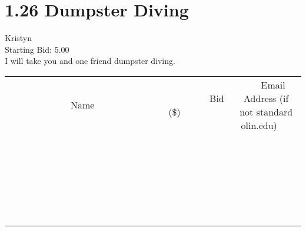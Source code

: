 \documentclass[11pt]{article}
\begin{document}
					\section*{1.26 Dumpster Diving}
					Kristyn \\
					Starting Bid: 5.00 \\
					I will take you and one friend dumpster diving. \\
					[6ex]
					\begin{tabular}{c c c}
						~~~~~~~~~~~~~Name~~~~~~~~~~~~~ & ~~~~~~~~~Bid (\$)~~~~~~~~~ & ~~~Email Address (if not standard olin.edu)~~~ \\
				
 & & \\
\hline
 & & \\
\hline
 & & \\
\hline
 & & \\
\hline
 & & \\
\hline
 & & \\
\hline
 & & \\
\hline
 & & \\
\hline
 & & \\
\hline
 & & \\
\hline
 & & \\
\hline
 & & \\
\hline
 & & \\
\hline
 & & \\
\hline
 & & \\
\hline
 & & \\
\hline
 & & \\
\hline
 & & \\
\hline
 & & \\
\hline
 & & \\
\hline
 & & \\
\hline
 & & \\
\hline
 & & \\
\hline
 & & \\
\hline
 & & \\
\hline
 & & \\
\hline
					\end{tabular}
					\clearpage
				
\end{document}
